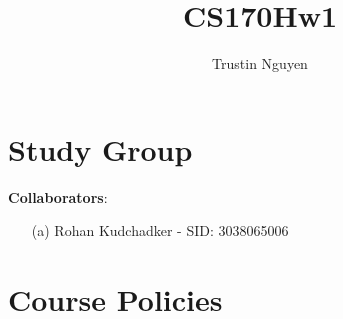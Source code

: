 \documentclass{article}
\title{CS170Hw1}
\author{Trustin Nguyen}
\begin{document}
    \maketitle

\reversemarginpar

\section*{Study Group}
\textbf{Collaborators}:
    \begin{itemize}
        \item [(a)] Rohan Kudchadker - SID: 3038065006
    \end{itemize}

\newpage

\section*{Course Policies}
\end{document}
